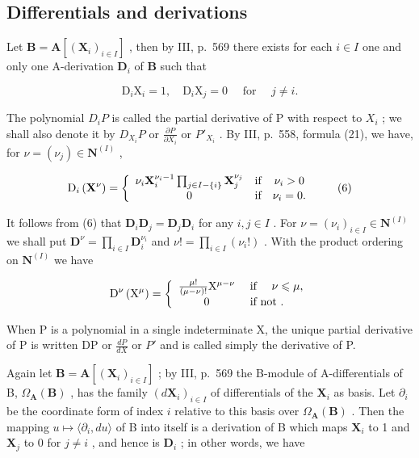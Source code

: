 \subsection{Differentials and derivations}

Let \(\mathbf{B} = \mathbf{A}[(\mathbf{X}_i)_{i\in I}]\) , then by III, p.~569 there exists for each \(i\in I\) one and only one A-derivation \(\mathbf{D}_i\) of \(\mathbf{B}\) such that

\[
\mathrm{D} _ {i} \mathrm{X} _ {i} = 1, \quad \mathrm{D} _ {i} \mathrm{X} _ {j} = 0 \quad \text { for } \quad j \neq i.\tag{5}
\]

The polynomial \(D_{i}P\) is called the partial derivative of P with respect to \(X_{i}\) ; we shall also denote it by \(D_{X_{i}}P\) or \(\frac{\partial P}{\partial X_{i}}\) or \(P'_{X_{i}}\) . By III, p.~558, formula (21), we have, for \(\nu = (\nu_{j}) \in \mathbf{N}^{(I)}\) ,

\[
\mathrm{D} _ {i} \left(\mathbf {X} ^ {\nu}\right) = \left\{ \begin{array}{c c c} \nu_ {i} \mathbf {X} _ {i} ^ {\nu_ {i} - 1} \prod_ {j \in I - \{i \}} \mathbf {X} _ {j} ^ {\nu_ {j}} & \text {if} & \nu_ {i} > 0 \\ 0 & \text {if} & \nu_ {i} = 0. \end{array} \right.\tag{6}
\]

It follows from (6) that \(\mathbf{D}_i\mathbf{D}_j = \mathbf{D}_j\mathbf{D}_i\) for any \(i, j \in I\) . For \(\nu = (\nu_i)_{i \in I} \in \mathbf{N}^{(I)}\) we shall put \(\mathbf{D}^{\nu} = \prod_{i \in I} \mathbf{D}_i^{\nu_i}\) and \(\nu! = \prod_{i \in I} (\nu_i!)\) . With the product ordering on \(\mathbf{N}^{(I)}\) we have

\[
\mathrm{D} ^ {\nu} \left(\mathrm{X} ^ {\mu}\right) = \left\{ \begin{array}{c l} \frac {\mu !}{(\mu - \nu) !} \mathrm{X} ^ {\mu - \nu} & \text { if } \quad \nu \leqslant \mu , \\ 0 & \text { if   not }. \end{array} \right.
\]

When P is a polynomial in a single indeterminate X, the unique partial derivative of P is written DP or \(\frac{dP}{dX}\) or \(P'\) and is called simply the derivative of P.

Again let \(\mathbf{B} = \mathbf{A}\left[(\mathbf{X}_i)_{i\in I}\right]\) ; by III, p.~569 the B-module of A-differentials of B, \(\Omega_{\mathbf{A}}(\mathbf{B})\) , has the family \((d\mathbf{X}_i)_{i\in I}\) of differentials of the \(\mathbf{X}_i\) as basis. Let \(\partial_i\) be the coordinate form of index \(i\) relative to this basis over \(\Omega_{\mathbf{A}}(\mathbf{B})\) . Then the mapping \(u\mapsto \langle \partial_i,du\rangle\) of B into itself is a derivation of B which maps \(\mathbf{X}_i\) to 1 and \(\mathbf{X}_j\) to 0 for \(j\neq i\) , and hence is \(\mathbf{D}_i\) ; in other words, we have

